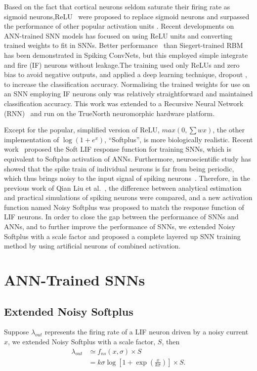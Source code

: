 \documentclass{article}
\begin{document}
Based on the fact that cortical neurons seldom saturate their firing rate as sigmoid neurons,ReLU~\cite{glorot2011deep} were proposed to replace sigmoid neurons and surpassed the performance of other popular activation units 
.
Recent developments on ANN-trained SNN models has focused on using ReLU units and converting trained weights to fit in SNNs.
Better performance~\cite{cao2015spiking,diehl2015fast} than Siegert-trained RBM has been demonstrated in Spiking ConvNets, but this employed simple integrate and fire (IF) neurons without leakage.The training used only ReLUs and zero bias to avoid negative outputs, and applied a deep learning technique, dropout\cite{srivastava2014dropout} , to increase the classification accuracy.
Normalising the trained weights for use on an SNN employing IF neurons only was relatively straightforward and maintained classification accuracy.
This work was extended to a Recursive Neural Network (RNN)~\cite{diehl2016conversion} and run on the TrueNorth\cite{merolla2014million} neuromorphic hardware platform.

Except for the popular, simplified version of ReLU, $max(0,\sum w x)$, the other implementation of $\log(1+e^x)$, ``Softplus'', is more biologically realistic.
Recent work~\cite{hunsberger2015spiking} proposed the Soft LIF response function for training SNNs, which is equivalent to Softplus activation of ANNs. Furthermore, neuroscientific study has showed that the spike train of individual neurons is far from being periodic, which thus brings noisy to the input signal of spiking neurons~\cite{Gerstner:2002}. Therefore, in the previous work of Qian Liu et al.~\cite{Noisysoftplus}, the difference between analytical estimation and practical simulations of spiking neurons were compared, and a new activation function named Noisy Softplus was proposed to match the response function of LIF neurons. In order to close the gap between the performance of SNNs and ANNs, and to further improve the performance of SNNs, we extended Noisy Softplus with a scale factor and proposed a complete layered up SNN training method by using artificial neurons of combined activation.


\section{ANN-Trained SNNs}	

\subsection{Extended Noisy Softplus}
\label{sec:af_model}
Suppose $\lambda_{out}$ represents the firing rate  of a LIF neuron driven by a noisy current $x$, we extended Noisy Softplus\cite{Noisysoftplus} with a scale factor, $S$, then
\begin{equation}
\begin{aligned}
\lambda_{out} &\simeq f_{ns}(x, \sigma) \times S\\
&=k \sigma \log [1 + \exp(\frac{x}{k \sigma})] \times S.
\end{aligned}
\label{equ:fit}
\end{equation}	
\end{document}
